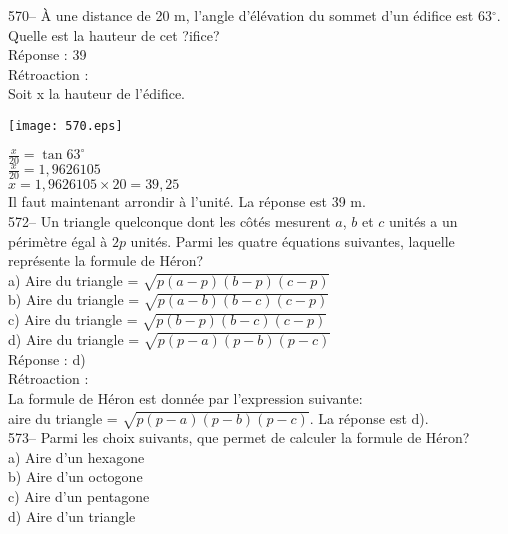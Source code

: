 ﻿\documentclass[letterpaper, 12pt]{article}
\begin{document}
570-- \`A une distance de 20 m, l'angle d'\'el\'evation du sommet d'un
\'edifice est 63$^{\circ}$. Quelle est la hauteur de cet ?ifice?\\

R\'eponse : 39  \\

R\'etroaction : \\
Soit x la hauteur de l'\'edifice.\\[2mm]   \begin{center}
    \texttt{[image: 570.eps]}
    \end{center}
$\frac{x}{20}=\tan 63^{\circ}$\\[2mm]
$\frac{x}{20}=1,9626105$\\[2mm]
$x=1,9626105\times20=39,25$\\[2mm]
Il faut maintenant arrondir \`a l'unit\'e.
La r\'eponse est 39 m.\\



572-- Un triangle quelconque dont les c\^ot\'es mesurent $a$, $b$ et $c$
unit\'es a un p\'erim\`etre \'egal \`a $2p$ unit\'es.  Parmi les quatre
\'equations suivantes, laquelle repr\'esente la formule de H\'eron?\\
a) Aire du triangle = $\sqrt{p\left( a-p\right) \left( b-p\right) \left(
c-p\right) }$\\[2mm]
b) Aire du triangle = $\sqrt{p\left( a-b\right) \left( b-c\right) \left(
c-p\right) }$\\[2mm]
c) Aire du triangle = $\sqrt{p\left( b-p\right) \left( b-c\right) \left(
c-p\right) }$\\[2mm]
d) Aire du triangle = $\sqrt{p\left( p-a\right) \left( p-b\right) \left(
p-c\right) }$\\

R\'eponse : d)\\

R\'etroaction : \\
La formule de H\'eron est donn\'ee par l'expression suivante:\\
aire du triangle = $\sqrt{p\left( p-a\right) \left( p-b\right) \left(
p-c\right) }$.  La r\'eponse est d).\\

573-- Parmi les choix suivants, que permet de calculer la formule de
H\'eron?\\
a) Aire d'un hexagone\\
b) Aire d'un octogone\\
c) Aire d'un pentagone\\
d) Aire d'un triangle\\
\end{document}
